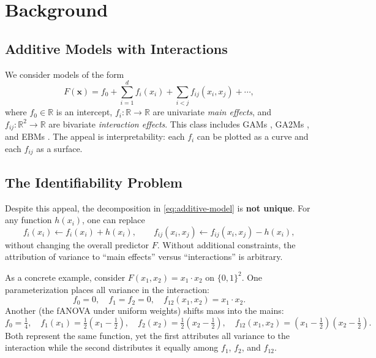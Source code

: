 \chapter{Background}\label{chap:background}

\section{Additive Models with Interactions}

We consider models of the form
\begin{equation}\label{eq:additive-model}
    F(\mathbf{x}) = f_0 + \sum_{i=1}^{d} f_i(x_i) + \sum_{i < j} f_{ij}(x_i, x_j) + \cdots,
\end{equation}
where $f_0 \in \mathbb{R}$ is an intercept, $f_i\colon \mathbb{R} \to \mathbb{R}$ are univariate \emph{main effects}, and $f_{ij}\colon \mathbb{R}^2 \to \mathbb{R}$ are bivariate \emph{interaction effects}.
This class includes \glspl{GAM} \citep{hastie1986generalized}, \glspl{GA2M} \citep{lou2013accurate}, and \glspl{EBM} \citep{nori2019interpretml}.
The appeal is interpretability: each $f_i$ can be plotted as a curve and each $f_{ij}$ as a surface.

\section{The Identifiability Problem}\label{sec:identifiability}

Despite this appeal, the decomposition in \cref{eq:additive-model} is \textbf{not unique}.
For any function $h(x_i)$, one can replace
\[
    f_i(x_i) \leftarrow f_i(x_i) + h(x_i), \qquad f_{ij}(x_i, x_j) \leftarrow f_{ij}(x_i, x_j) - h(x_i),
\]
without changing the overall predictor $F$.
Without additional constraints, the attribution of variance to ``main effects'' versus ``interactions'' is arbitrary.

As a concrete example, consider $F(x_1, x_2) = x_1 \cdot x_2$ on $\{0,1\}^2$.
One parameterization places all variance in the interaction:
\[
    f_0 = 0, \quad f_1 = f_2 = 0, \quad f_{12}(x_1, x_2) = x_1 \cdot x_2.
\]
Another (the fANOVA under uniform weights) shifts mass into the mains:
\[
    f_0 = \tfrac{1}{4}, \quad f_1(x_1) = \tfrac{1}{2}(x_1 - \tfrac{1}{2}), \quad f_2(x_2) = \tfrac{1}{2}(x_2 - \tfrac{1}{2}), \quad f_{12}(x_1, x_2) = (x_1 - \tfrac{1}{2})(x_2 - \tfrac{1}{2}).
\]
Both represent the same function, yet the first attributes all variance to the interaction while the second distributes it equally among $f_1$, $f_2$, and $f_{12}$.

